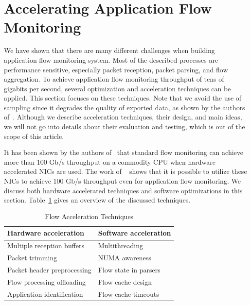 
\section{Accelerating Application Flow Monitoring}

We have shown that there are many different challenges when building application flow monitoring system. Most of the described processes are performance sensitive, especially packet reception, packet parsing, and flow aggregation. To achieve application flow monitoring throughput of tens of gigabits per second, several optimization and acceleration techniques can be applied. This section focuses on these techniques. Note that we avoid the use of sampling since it degrades the quality of exported data, as shown by the authors of~\cite{Brauckhoff-2006-Impact}. Although we describe acceleration techniques, their design, and main ideas, we will not go into details about their evaluation and testing, which is out of the scope of this article. 

It has been shown by the authors of~\cite{Velan-2015-High} that standard flow monitoring can achieve more than 100 Gb/s throughput on a commodity CPU when hardware accelerated NICs are used. The work of \citeauthor{Kekely-2016-Software}~\cite{Kekely-2016-Software} shows that it is possible to utilize these NICs to achieve 100 Gb/s throughput even for application flow monitoring. We discuss both hardware accelerated techniques and software optimizations in this section. Table~\ref{tab:flow-acc-techniques} gives an overview of the discussed techniques.


\begin{table}[ht!]
	\centering
	\begin{tabular}{|l|l|}
	\hline
	\textbf{Hardware acceleration} & \textbf{Software acceleration} \\ \hline
	Multiple reception buffers & Multithreading \\
	Packet trimming & NUMA awareness \\
	Packet header preprocessing & Flow state in parsers \\
	Flow processing offloading & Flow cache design \\
	Application identification & Flow cache timeouts \\ \hline
	\end{tabular}
	\caption{Flow Acceleration Techniques}
	\label{tab:flow-acc-techniques}
\end{table}


